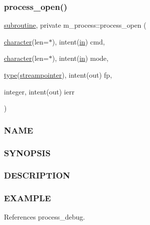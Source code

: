 \subsubsection{\texorpdfstring{process\+\_\+open()}{process\_open()}}
{\footnotesize\ttfamily \hyperlink{M__stopwatch_83_8txt_acfbcff50169d691ff02d4a123ed70482}{subroutine}, private m\+\_\+process\+::process\+\_\+open (\begin{DoxyParamCaption}\item[{\hyperlink{option__stopwatch_83_8txt_abd4b21fbbd175834027b5224bfe97e66}{character}(len=$\ast$), intent(\hyperlink{M__journal_83_8txt_afce72651d1eed785a2132bee863b2f38}{in})}]{cmd,  }\item[{\hyperlink{option__stopwatch_83_8txt_abd4b21fbbd175834027b5224bfe97e66}{character}(len=$\ast$), intent(\hyperlink{M__journal_83_8txt_afce72651d1eed785a2132bee863b2f38}{in})}]{mode,  }\item[{\hyperlink{stop__watch_83_8txt_a70f0ead91c32e25323c03265aa302c1c}{type}(\hyperlink{structm__process_1_1streampointer}{streampointer}), intent(out)}]{fp,  }\item[{integer, intent(out)}]{ierr }\end{DoxyParamCaption})\hspace{0.3cm}{\ttfamily [private]}}



\subsubsection*{N\+A\+ME}

\subsubsection*{S\+Y\+N\+O\+P\+S\+IS}

\subsubsection*{D\+E\+S\+C\+R\+I\+P\+T\+I\+ON}

\subsubsection*{E\+X\+A\+M\+P\+LE}

References process\+\_\+debug.

\mbox{\label{namespacem__process_aaaf4d1926258a4cec7da7fc61c38c79d}} 
